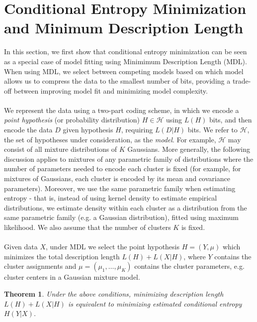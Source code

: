 \documentclass{article} %
\newtheorem{theorem}{Theorem}
\begin{document}
\section{Conditional Entropy Minimization and Minimum Description Length}
In this section, we first show that conditional entropy minimization can be seen as a special case of model fitting using Minimimum Description Length (MDL). When using MDL, we select between competing models based on which model allows us to compress the data to the smallest number of bits, providing a trade-off between improving model fit and minimizing model complexity\cite{rissanen1978modeling}. \\\\
We represent the data using a two-part coding scheme, in which we encode a \textit{point hypothesis} (or probability distribution) $H \in \mathcal{H}$ using $L(H)$ bits, and then encode the data $D$ given hypothesis $H$, requiring $L(D | H)$ bits. We refer to $\mathcal{H}$, the set of hypotheses under consideration, as the \textit{model}. For example, $\mathcal{H}$ may consist of all mixture distributions of $K$ Gaussians. More generally, the following discussion applies to mixtures of any parametric family of distributions where the number of parameters needed to encode each cluster is fixed (for example, for mixtures of Gaussians, each cluster is encoded by its mean and covariance parameters). Moreover, we use the same parametric family when estimating entropy - that is, instead of using kernel density to estimate empirical distributions, we estimate density within each cluster as a distribution from the same parametric family (e.g. a Gaussian distribution), fitted using maximum likelihood. We also assume that the number of clusters $K$ is fixed.  \\\\
Given data $X$, under MDL we select the point hypothesis $H  = (Y, \mu)$ which minimizes the total description length $L(H) + L(X|H)$, where $Y$ contains the cluster assignments and $\mu=(\mu_1, \dots, \mu_K)$ contains the cluster parameters, e.g. cluster centers in a Gaussian mixture model.\\
\begin{theorem}
Under the above conditions, minimizing description length $L(H) + L(X|H)$ is equivalent to minimizing estimated conditional entropy $H(Y|X)$.
\end{theorem}
\end{document}

